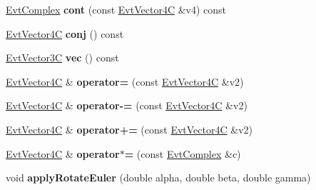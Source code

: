 \begin{DoxyCompactItemize}
\item 
\hypertarget{class_evt_vector4_c_aecc92784fa8313e260cbcbc1847c2790}{}\hyperlink{class_evt_complex}{Evt\+Complex} {\bfseries cont} (const \hyperlink{class_evt_vector4_c}{Evt\+Vector4\+C} \&v4) const \label{class_evt_vector4_c_aecc92784fa8313e260cbcbc1847c2790}

\item 
\hypertarget{class_evt_vector4_c_ad2ada71f037e324b0d016a6d52e6b2ce}{}\hyperlink{class_evt_vector4_c}{Evt\+Vector4\+C} {\bfseries conj} () const \label{class_evt_vector4_c_ad2ada71f037e324b0d016a6d52e6b2ce}

\item 
\hypertarget{class_evt_vector4_c_a946d241ddd255451e4cf0972f73aa135}{}\hyperlink{class_evt_vector3_c}{Evt\+Vector3\+C} {\bfseries vec} () const \label{class_evt_vector4_c_a946d241ddd255451e4cf0972f73aa135}

\item 
\hypertarget{class_evt_vector4_c_ae5959b3895ee9d5565cb3d7ce3803b0e}{}\hyperlink{class_evt_vector4_c}{Evt\+Vector4\+C} \& {\bfseries operator=} (const \hyperlink{class_evt_vector4_c}{Evt\+Vector4\+C} \&v2)\label{class_evt_vector4_c_ae5959b3895ee9d5565cb3d7ce3803b0e}

\item 
\hypertarget{class_evt_vector4_c_aaa5ec8b6ff75afdcb2954ef26c7d4684}{}\hyperlink{class_evt_vector4_c}{Evt\+Vector4\+C} \& {\bfseries operator-\/=} (const \hyperlink{class_evt_vector4_c}{Evt\+Vector4\+C} \&v2)\label{class_evt_vector4_c_aaa5ec8b6ff75afdcb2954ef26c7d4684}

\item 
\hypertarget{class_evt_vector4_c_a3e45326926631ba68f11a286cf3f839e}{}\hyperlink{class_evt_vector4_c}{Evt\+Vector4\+C} \& {\bfseries operator+=} (const \hyperlink{class_evt_vector4_c}{Evt\+Vector4\+C} \&v2)\label{class_evt_vector4_c_a3e45326926631ba68f11a286cf3f839e}

\item 
\hypertarget{class_evt_vector4_c_aefb83d21e474ad67c61494f2c1287c2f}{}\hyperlink{class_evt_vector4_c}{Evt\+Vector4\+C} \& {\bfseries operator$\ast$=} (const \hyperlink{class_evt_complex}{Evt\+Complex} \&c)\label{class_evt_vector4_c_aefb83d21e474ad67c61494f2c1287c2f}

\item 
\hypertarget{class_evt_vector4_c_a1ffb50c08c0bcca21e7be8e08cb8afb3}{}void {\bfseries apply\+Rotate\+Euler} (double alpha, double beta, double gamma)\label{class_evt_vector4_c_a1ffb50c08c0bcca21e7be8e08cb8afb3}


\end{DoxyCompactItemize}
